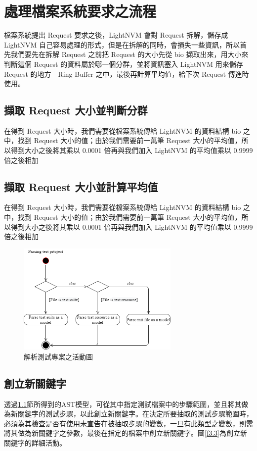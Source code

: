 \section{處理檔案系統要求之流程}\label{s3.2}
\indent
檔案系統提出 Request 要求之後，LightNVM 會對 Request 拆解，儲存成 LightNVM 自己容易處理的形式，但是在拆解的同時，會損失一些資訊，所以首先我們要先在拆解 Request 之前把 Request 的大小先從 bio 擷取出來，用大小來判斷這個 Request 的資料屬於哪一個分群，並將資訊塞入 LightNVM 用來儲存 Request 的地方 - Ring Buffer 之中，最後再計算平均值，給下次 Request 傳進時使用。

\subsection{擷取 Request 大小並判斷分群}\label{s3.2.1}
\indent
在得到 Request 大小時，我們需要從檔案系統傳給 LightNVM 的資料結構 bio 之中，找到 Request 大小的值；由於我們需要前一萬筆 Request 大小的平均值，所以得到大小之後將其乘以 0.0001 倍再與我們加入 LightNVM 的平均值乘以 0.9999 倍之後相加

\subsection{擷取 Request 大小並計算平均值}\label{s3.2.3}
\indent
在得到 Request 大小時，我們需要從檔案系統傳給 LightNVM 的資料結構 bio 之中，找到 Request 大小的值；由於我們需要前一萬筆 Request 大小的平均值，所以得到大小之後將其乘以 0.0001 倍再與我們加入 LightNVM 的平均值乘以 0.9999 倍之後相加

\begin{figure}[H]
    \centering
    \includegraphics[width=0.7\textwidth]{picture/Parse_test_project.png}
    \caption{解析測試專案之活動圖}
    \label{f3.2}
\end{figure}

\subsection{創立新關鍵字}\label{s3.1.2}
\indent
透過\ref{s3.2.1}節所得到的AST模型，可從其中指定測試檔案中的步驟範圍，並且將其做為新關鍵字的測試步驟，以此創立新關鍵字。在決定所要抽取的測試步驟範圍時，必須為其檢查是否有使用未宣告在被抽取步驟的變數，一旦有此類型之變數，則需將其做為新關鍵字之參數，最後在指定的檔案中創立新關鍵字。圖\ref{f3.3}為創立新關鍵字的詳細活動。

